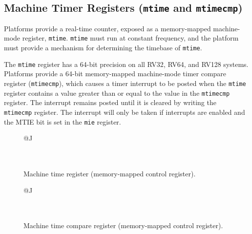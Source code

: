 \subsection{Machine Timer Registers ({\tt mtime} and {\tt mtimecmp})}

Platforms provide a real-time counter, exposed as a memory-mapped
machine-mode register, {\tt mtime}.  {\tt mtime} must run at constant
frequency, and the platform must provide a mechanism for determining
the timebase of {\tt mtime}.

The {\tt mtime} register has a 64-bit precision on all RV32, RV64, and
RV128 systems.  Platforms provide a 64-bit memory-mapped machine-mode
timer compare register ({\tt mtimecmp}), which causes a timer
interrupt to be posted when the {\tt mtime} register contains a value
greater than or equal to the value in the {\tt mtimecmp} register.
The interrupt remains posted until it is cleared by writing the {\tt
  mtimecmp} register.  The interrupt will only be taken if interrupts
are enabled and the MTIE bit is set in the {\tt mie} register.

\begin{figure}[h!]
{\footnotesize
\begin{center}
\begin{tabular}{@{}J}
 \\
\hline
{} \\
 \\
\end{tabular}
\end{center}
}
\vspace{-0.1in}
\caption{Machine time register (memory-mapped control register).}
\end{figure}

\begin{figure}[h!]
{\footnotesize
\begin{center}
\begin{tabular}{@{}J}
 \\
\hline
{} \\
 \\
\end{tabular}
\end{center}
}
\vspace{-0.1in}
\caption{Machine time compare register (memory-mapped control register).}
\end{figure}

